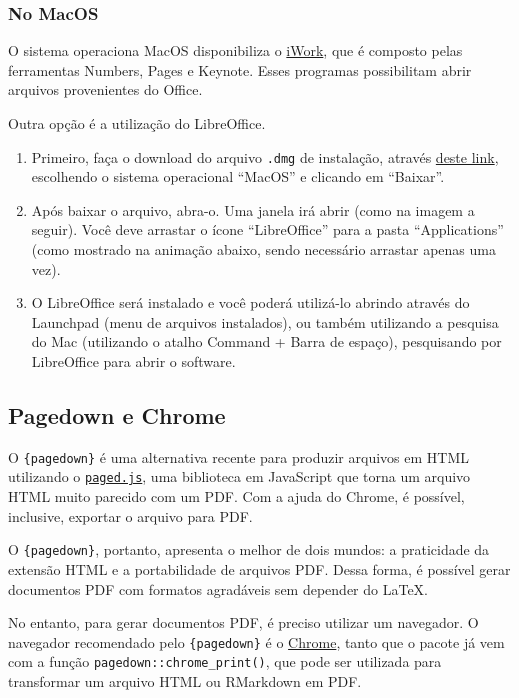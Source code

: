 \documentclass[
]{book}
\begin{document}
\hypertarget{no-macos-2}{%
\subsubsection{No MacOS}\label{no-macos-2}}

O sistema operaciona MacOS disponibiliza o \href{https://www.apple.com/br/iwork/}{iWork}, que é composto pelas ferramentas Numbers, Pages e Keynote. Esses programas possibilitam abrir arquivos provenientes do Office.

Outra opção é a utilização do LibreOffice.

\begin{enumerate}
\def\labelenumi{\arabic{enumi}.}
\item
  Primeiro, faça o download do arquivo \texttt{.dmg} de instalação, através \href{https://pt-br.libreoffice.org/baixe-ja/libreoffice-novo/}{deste link}, escolhendo o sistema operacional ``MacOS'' e clicando em ``Baixar''.
\item
  Após baixar o arquivo, abra-o. Uma janela irá abrir (como na imagem a seguir). Você deve arrastar o ícone ``LibreOffice'' para a pasta ``Applications'' (como mostrado na animação abaixo, sendo necessário arrastar apenas uma vez).
\item
  O LibreOffice será instalado e você poderá utilizá-lo abrindo através do Launchpad (menu de arquivos instalados), ou também utilizando a pesquisa do Mac (utilizando o atalho Command + Barra de espaço), pesquisando por LibreOffice para abrir o software.
\end{enumerate}

\hypertarget{pagedown-e-chrome}{%
\subsection{Pagedown e Chrome}\label{pagedown-e-chrome}}

O \texttt{\{pagedown\}} é uma alternativa recente para produzir arquivos em HTML utilizando o \href{https://www.pagedjs.org/}{\texttt{paged.js}}, uma biblioteca em JavaScript que torna um arquivo HTML muito parecido com um PDF. Com a ajuda do Chrome, é possível, inclusive, exportar o arquivo para PDF.

O \texttt{\{pagedown\}}, portanto, apresenta o melhor de dois mundos: a praticidade da extensão HTML e a portabilidade de arquivos PDF. Dessa forma, é possível gerar documentos PDF com formatos agradáveis sem depender do LaTeX.

No entanto, para gerar documentos PDF, é preciso utilizar um navegador. O navegador recomendado pelo \texttt{\{pagedown\}} é o \href{https://www.google.com/intl/pt-BR/chrome/}{Chrome}, tanto que o pacote já vem com a função \texttt{pagedown::chrome\_print()}, que pode ser utilizada para transformar um arquivo HTML ou RMarkdown em PDF.
\end{document}
